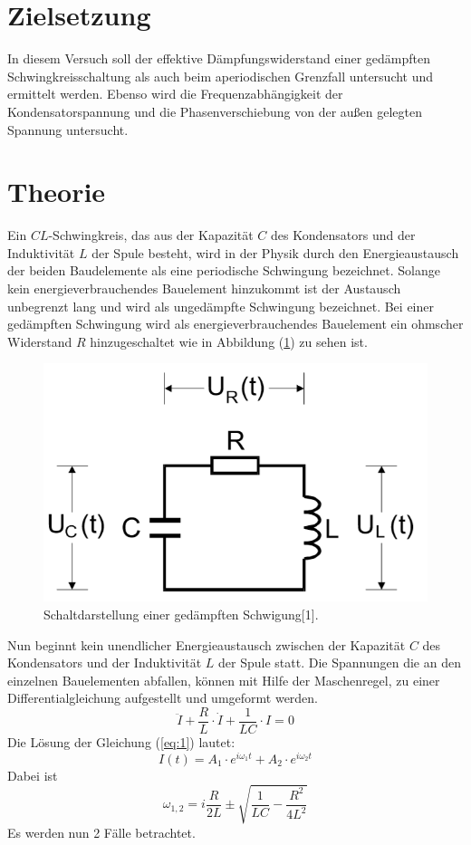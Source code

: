 \section{Zielsetzung}
In diesem Versuch soll der effektive Dämpfungswiderstand
einer gedämpften Schwingkreisschaltung als auch beim aperiodischen Grenzfall
untersucht und ermittelt werden. Ebenso wird die Frequenzabhängigkeit
der Kondensatorspannung und die Phasenverschiebung von der außen gelegten Spannung
untersucht.
\section{Theorie}
Ein $CL$-Schwingkreis, das aus der Kapazität $C$ des Kondensators und der
Induktivität $L$ der Spule besteht, wird in der Physik durch den
Energieaustausch der beiden Baudelemente als eine periodische Schwingung bezeichnet.
Solange kein energieverbrauchendes Bauelement hinzukommt ist der Austausch unbegrenzt lang
und wird als ungedämpfte Schwingung bezeichnet.
Bei einer gedämpften Schwingung wird als energieverbrauchendes Bauelement ein ohmscher Widerstand $R$
hinzugeschaltet wie in Abbildung (\ref{fig:1}) zu sehen ist.
\begin{figure}[H]
\centering
\includegraphics[width=\textwidth]{Schwingkreis.png}
\caption{Schaltdarstellung einer gedämpften Schwigung[1].}
\label{fig:1}
\end{figure}
Nun beginnt kein unendlicher Energieaustausch zwischen der Kapazität $C$
des Kondensators und der Induktivität $L$ der Spule statt.
Die Spannungen die an den einzelnen Bauelementen abfallen,
können mit Hilfe der Maschenregel, zu einer Differentialgleichung aufgestellt und umgeformt werden.
\begin{equation}
  \ddot{I} + \frac{R}{L} \cdot \dot{I} +\frac{1}{LC}\cdot I = 0
  \label{eq:1}
\end{equation}
Die Lösung der Gleichung (\ref{eq:1}) lautet:
\begin{equation}
  I(t) = A_1 \cdot e^{i\omega_1 t} + A_2 \cdot e^{i\omega_2 t}
  \label{eq:2}
\end{equation}
Dabei ist
\begin{equation*}
  \omega_{1,2} =  i \frac{R}{2L} \pm \sqrt{\frac{1}{LC} - \frac{R^2}{4L^2}}
\end{equation*}
Es werden nun 2 Fälle betrachtet.\\

